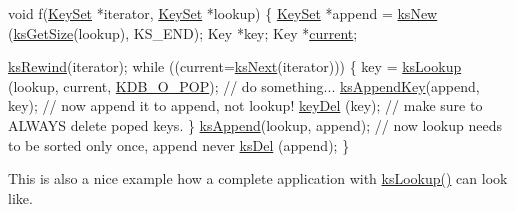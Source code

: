 \begin{DoxyCodeInclude}
\textcolor{keywordtype}{void} f(\hyperlink{classkdb_1_1KeySet_a4eac9850fa4f06c07a5306befc3e4377}{KeySet} *iterator, \hyperlink{classkdb_1_1KeySet_a4eac9850fa4f06c07a5306befc3e4377}{KeySet} *lookup)
\{
        \hyperlink{classkdb_1_1KeySet_a4eac9850fa4f06c07a5306befc3e4377}{KeySet} *append = \hyperlink{group__keyset_ga671e1aaee3ae9dc13b4834a4ddbd2c3c}{ksNew} (\hyperlink{group__keyset_ga7474ad6b0a0fa969dbdf267ba5770eee}{ksGetSize}(lookup), KS\_END);
        Key *key;
        Key *\hyperlink{classkdb_1_1KeySet_a2c9c26dbbf5ec0ed82093e1793a79fe1}{current};

        \hyperlink{group__keyset_gabe793ff51f1728e3429c84a8a9086b70}{ksRewind}(iterator);
        \textcolor{keywordflow}{while} ((current=\hyperlink{group__keyset_ga317321c9065b5a4b3e33fe1c399bcec9}{ksNext}(iterator)))
        \{
                key = \hyperlink{group__keyset_gaa34fc43a081e6b01e4120daa6c112004}{ksLookup} (lookup, current, \hyperlink{group__keyset_gga98a3d6a4016c9dad9cbd1a99a9c2a45aa52fb5f2cc86773d393da62bebebf7984}{KDB\_O\_POP});
                \textcolor{comment}{// do something...}
                \hyperlink{group__keyset_gaa5a1d467a4d71041edce68ea7748ce45}{ksAppendKey}(append, key); \textcolor{comment}{// now append it to append, not lookup!}
                \hyperlink{group__key_ga3df95bbc2494e3e6703ece5639be5bb1}{keyDel} (key); \textcolor{comment}{// make sure to ALWAYS delete poped keys.}
        \}
        \hyperlink{group__keyset_ga21eb9c3a14a604ee3a8bdc779232e7b7}{ksAppend}(lookup, append);
        \textcolor{comment}{// now lookup needs to be sorted only once, append never}
        \hyperlink{group__keyset_ga27e5c16473b02a422238c8d970db7ac8}{ksDel} (append);
\}
\end{DoxyCodeInclude}
 This is also a nice example how a complete application with \hyperlink{group__keyset_gaa34fc43a081e6b01e4120daa6c112004}{ks\+Lookup()} can look like.

